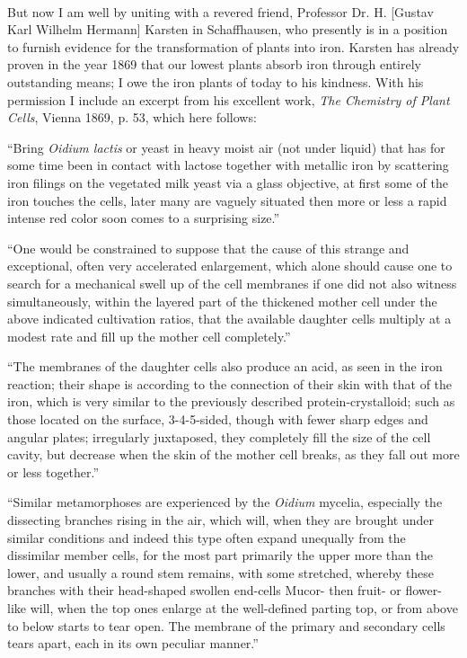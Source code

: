 \documentclass[a4paper, 12pt, oneside]{article}
\begin{document}
\paragraph*{}
But now I am well by uniting with a revered friend, Professor Dr. H. [Gustav Karl Wilhelm Hermann] Karsten in Schaffhausen, who presently is in a position to furnish evidence for the transformation of plants into iron. Karsten has already proven in the year 1869 that our lowest plants absorb iron through entirely outstanding means; I owe the iron plants of today to his kindness. With his permission I include an excerpt from his excellent work, \emph{The Chemistry of Plant Cells}, Vienna 1869, p. 53, which here follows:

``Bring \emph{Oidium lactis} or yeast in heavy moist air (not under liquid) that has for some time been in contact with lactose together with metallic iron by scattering iron filings on the vegetated milk yeast via a glass objective, at first some of the iron touches the cells, later many are vaguely situated then more or less a rapid intense red color soon comes to a surprising size.''

``One would be constrained to suppose that the cause of this strange and exceptional, often very accelerated enlargement, which alone should cause one to search for a mechanical swell up of the cell membranes if one did not also witness simultaneously, within the layered part of the thickened mother cell under the above indicated cultivation ratios, that the available daughter cells multiply at a modest rate and fill up the mother cell completely.''

``The membranes of the daughter cells also produce an acid, as seen in the iron reaction; their shape is according to the connection of their skin with that of the iron, which is very similar to the previously described protein-crystalloid; such as those located on the surface, 3-4-5-sided, though with fewer sharp edges and angular plates; irregularly juxtaposed, they completely fill the size of the cell cavity, but decrease when the skin of the mother cell breaks, as they fall out more or less together.''

``Similar metamorphoses are experienced by the \emph{Oidium} mycelia, especially the dissecting branches rising in the air, which will, when they are brought under similar conditions and indeed this type often expand unequally from the dissimilar member cells, for the most part primarily the upper more than the lower, and usually a round stem remains, with some stretched, whereby these branches with their head-shaped swollen end-cells Mucor- then fruit- or flower-like will, when the top ones enlarge at the well-defined parting top, or from above to below starts to tear open. The membrane of the primary and secondary cells tears apart, each in its own peculiar manner.''
\end{document}
